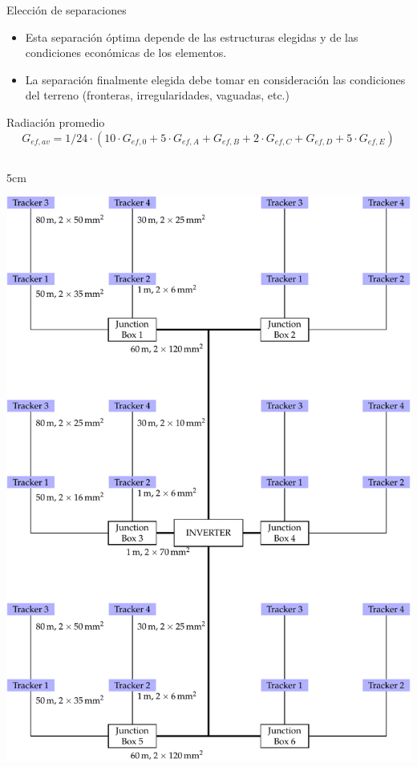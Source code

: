 \documentclass[xcolor={usenames,svgnames,dvipsnames}]{beamer}
\begin{document}
\begin{frame}[label={sec:org44ad279}]{Elección de separaciones}
\begin{itemize}
\item Esta separación óptima \alert{depende} de las \alert{estructuras elegidas} y de
las \alert{condiciones económicas} de los elementos.

\item La separación finalmente elegida debe \alert{tomar en consideración las
condiciones del terreno} (fronteras, irregularidades, vaguadas, etc.)
\end{itemize}
\end{frame}

\begin{frame}[label={sec:org9d82c54}]{Radiación promedio}
$$G_{ef, av} = 1/24 \cdot \left( 10 \cdot G_{ef,0} + 5 \cdot G_{ef,A} + G_{ef,B} + 2 \cdot G_{ef,C} + G_{ef,D} + 5 \cdot G_{ef,E} \right)$$

\begin{columns}
\begin{column}{5cm\columnwidth}
\begin{center}
\includegraphics[width=.9\linewidth]{../figs/plantConfiguration.pdf}
\end{center}
\end{column}


\end{columns}
\end{frame}
\end{document}
